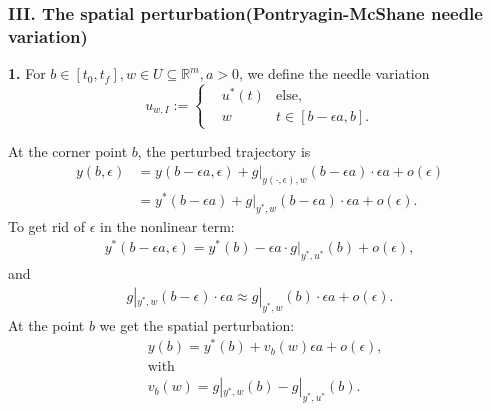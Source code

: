 \subsubsection{III. The spatial perturbation(Pontryagin-McShane needle variation)}
\textbf{1. }For $b \in [t_0, t_f], w \in U \subseteq \mathbb{R}^m, a >0$, we define the needle variation
\begin{equation}
u_{w, I}:= \left\{
\begin{aligned}
&u^*(t) & \text{else},\\
&w	& t \in [b - \epsilon a , b].
\end{aligned}
\right.
\end{equation}

At the corner point $b$, the perturbed trajectory is 
\begin{align*}
	y(b, \epsilon) &= y(b - \epsilon a, \epsilon) + g|_{y(\cdot, \epsilon) , w}(b - \epsilon a) \cdot \epsilon a + o(\epsilon)\\
	& = y^*(b - \epsilon a) + g|_{y^*, w} (b - \epsilon a) \cdot \epsilon a + o(\epsilon).
\end{align*}
To get rid of $\epsilon$ in the nonlinear term:
\begin{align*}
	y^*(b - \epsilon a, \epsilon) = y^*(b) - \epsilon a \cdot g|_{y^*, u^*}(b) + o(\epsilon),
\end{align*}
and
\begin{align*}
	g|_{y^*, w}(b - \epsilon) \cdot \epsilon a \approx g|_{y^*, w}(b) \cdot \epsilon a + o(\epsilon). 
\end{align*}
At the point $b$ we get the spatial perturbation:
\begin{equation}\label{eq:needle-var-spatial}
\begin{aligned}
	& y(b) = y^*(b) + v_b(w) \epsilon a + o(\epsilon), \\
	& \text{with}\\
	& v_b(w) = g|_{y^*, w}(b) - g|_{y^*, u^*}(b). 
\end{aligned}
\end{equation}

